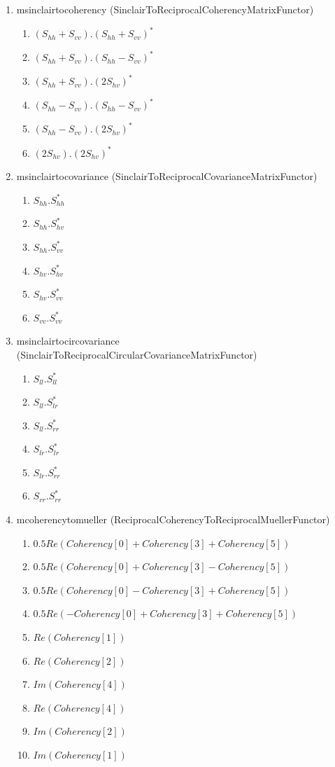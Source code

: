 \begin{enumerate}
\renewcommand{\labelenumii}{Channel \arabic{enumii} : }
\item msinclairtocoherency (SinclairToReciprocalCoherencyMatrixFunctor)
\begin{enumerate}
\item $ (S_{hh}+S_{vv}).(S_{hh}+S_{vv})^{*} $
\item $ (S_{hh}+S_{vv}).(S_{hh}-S_{vv})^{*} $
\item $ (S_{hh}+S_{vv}).(2 S_{hv})^{*} $
\item $ (S_{hh}-S_{vv}).(S_{hh}-S_{vv})^{*} $
\item $ (S_{hh}-S_{vv}).(2 S_{hv})^{*} $
\item $ (2 S_{hv}).(2 S_{hv})^{*} $
\end{enumerate}
 
\item msinclairtocovariance (SinclairToReciprocalCovarianceMatrixFunctor)
\begin{enumerate}
\item $ S_{hh}.S_{hh}^{*} $ 
\item $ S_{hh}.S_{hv}^{*} $ 
\item $ S_{hh}.S_{vv}^{*} $ 
\item $ S_{hv}.S_{hv}^{*} $ 
\item $ S_{hv}.S_{vv}^{*} $ 
\item $ S_{vv}.S_{vv}^{*} $
\end{enumerate}
 
\item msinclairtocircovariance (SinclairToReciprocalCircularCovarianceMatrixFunctor)
\begin{enumerate}
\item $ S_{ll}.S_{ll}^{*} $ 
\item $ S_{ll}.S_{lr}^{*} $ 
\item $ S_{ll}.S_{rr}^{*} $ 
\item $ S_{lr}.S_{lr}^{*} $ 
\item $ S_{lr}.S_{rr}^{*} $ 
\item $ S_{rr}.S_{rr}^{*} $
\end{enumerate}
 
\item mcoherencytomueller (ReciprocalCoherencyToReciprocalMuellerFunctor)
\begin{enumerate}
\item $ 0.5 Re( Coherency[0]+Coherency[3]+Coherency[5]) $ 
\item $ 0.5 Re( Coherency[0]+Coherency[3]-Coherency[5]) $ 
\item $ 0.5 Re( Coherency[0]-Coherency[3]+Coherency[5]) $ 
\item $ 0.5 Re(-Coherency[0]+Coherency[3]+Coherency[5]) $ 
\item $ Re(Coherency[1]) $ 
\item $ Re(Coherency[2]) $ 
\item $ Im(Coherency[4]) $ 
\item $ Re(Coherency[4]) $ 
\item $ Im(Coherency[2]) $ 
\item $ Im(Coherency[1]) $
\end{enumerate}
 

\end{enumerate}
